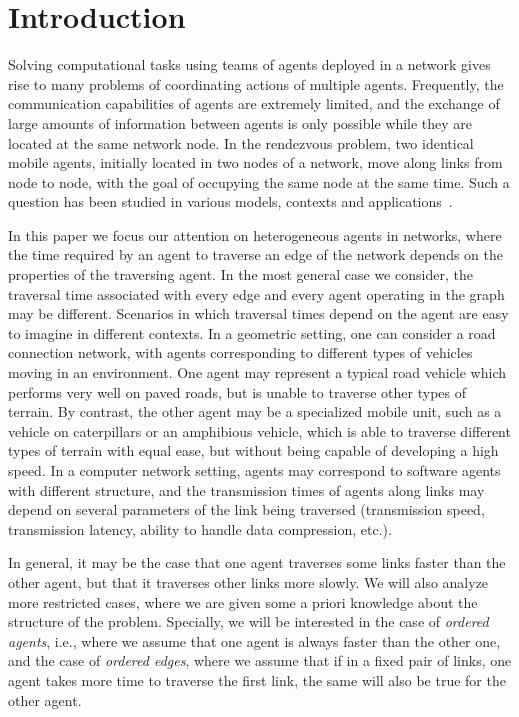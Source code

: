 \documentclass{llncs}
\begin{document}
\section{Introduction}

Solving computational tasks using teams of agents deployed in a network gives rise to many problems of coordinating actions of multiple agents. Frequently, the communication capabilities of agents are extremely limited, and the exchange of large amounts of information between agents is only possible while they are located at the same network node.
In the rendezvous problem, two identical mobile agents, initially located in two nodes of a network, move along links from node to node, with the goal of occupying the same node at the same time. Such a question has been studied in various models, contexts and applications~\cite{opac-b1117985}.

In this paper we focus our attention on heterogeneous agents in networks, where the time required by an agent to traverse an edge of the network  depends on the properties of the traversing agent. In the most general case we consider, the traversal time associated with every edge and every agent operating in the graph may be different. Scenarios in which traversal times depend on the agent are easy to imagine in different contexts. In a geometric setting, one can consider a road connection network, with agents corresponding to different types of vehicles moving in an environment. One agent may represent a typical road vehicle which performs very well on paved roads, but is unable to traverse other types of terrain. By contrast, the other agent may be a specialized mobile unit, such as a vehicle on caterpillars or an amphibious vehicle, which is able to traverse different types of terrain with equal ease, but without being capable of developing a high speed. In a computer network setting, agents may correspond to software agents with different structure, and the transmission times of agents along links may depend on several parameters of the link being traversed (transmission speed, transmission latency, ability to handle data compression, etc.). 

In general, it may be the case that one agent traverses some links faster than the other agent, but that it traverses other links more slowly. We will also analyze more restricted cases, where we are given some a priori knowledge about the structure of the problem. Specially, we will be interested in the case of \emph{ordered agents}, i.e., where we assume that one agent is always faster than the other one, and the case of \emph{ordered edges}, where we assume that if in a fixed pair of links, one agent takes more time to traverse the first link, the same will also be true for the other agent.
\end{document}
